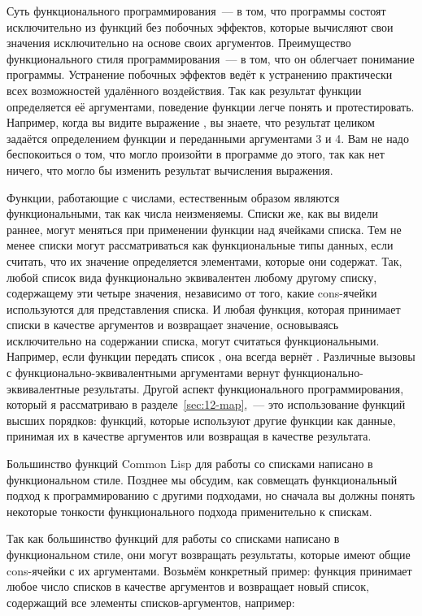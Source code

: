Суть функционального программирования~--- в том, что программы состоят исключительно из
функций без побочных эффектов, которые вычисляют свои значения исключительно на основе
своих аргументов. Преимущество функционального стиля программирования~--- в том, что он
облегчает понимание программы. Устранение побочных эффектов ведёт к устранению практически
всех возможностей удалённого воздействия. Так как результат функции определяется её
аргументами, поведение функции легче понять и протестировать. Например, когда вы видите
выражение , вы знаете, что результат целиком задаётся определением функции
\code{+} и переданными аргументами 3 и 4. Вам не надо беспокоиться о том, что могло
произойти в программе до этого, так как нет ничего, что могло бы изменить результат
вычисления выражения.

Функции, работающие с числами, естественным образом являются функциональными, так как числа
неизменяемы. Списки же, как вы видели раннее, могут меняться при применении функции
 над ячейками списка. Тем не менее списки могут рассматриваться как
функциональные типы данных, если считать, что их значение определяется элементами, которые
они содержат. Так, любой список вида  функционально эквивалентен любому
другому списку, содержащему эти четыре значения, независимо от того, какие cons-ячейки
используются для представления списка. И любая функция, которая принимает списки в
качестве аргументов и возвращает значение, основываясь исключительно на содержании списка,
могут считаться функциональными. Например, если функции  передать список
, она всегда вернёт . Различные вызовы  с
функционально-эквивалентными аргументами вернут функционально-эквивалентные
результаты. Другой аспект функционального программирования, который я рассматриваю в
разделе~\ref{sec:12-map},~--- это использование функций высших порядков: функций, которые
используют другие функции как данные, принимая их в качестве аргументов или возвращая в
качестве результата.

Большинство функций Common Lisp для работы со списками написано в функциональном
стиле. Позднее мы обсудим, как совмещать функциональный подход к программированию с другими
подходами, но сначала вы должны понять некоторые тонкости функционального подхода
применительно к спискам.

Так как большинство функций для работы со списками написано в функциональном стиле, они могут
возвращать результаты, которые имеют общие cons-ячейки с их аргументами. Возьмём
конкретный пример: функция  принимает любое число списков в качестве
аргументов и возвращает новый список, содержащий все элементы списков-аргументов,
например:

